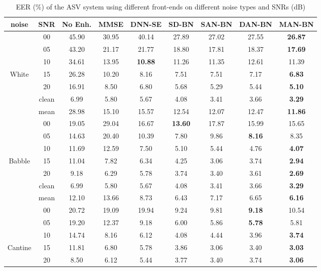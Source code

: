 \documentclass[a4paper,oneside,12pt]{book}
\begin{document}
\begin{table}
\renewcommand{\arraystretch}{1.0}
\caption{ EER ($\%$) of the ASV system using different front-ends on different noise types and SNRs (dB) }
\label{tab:clean}
\begin{tabular}{| c | c | c | c| c|c| c| c|c|}
\hline
noise   &SNR  &No Enh. &MMSE &DNN-SE &SD-BN &SAN-BN & DAN-BN & MAN-BN\\
\hline
      & 00 &45.90 &30.95 &40.14 &27.89 & 27.02 &27.55 &\textbf{26.87}   \\ 
      & 05 &43.20 &21.17 &21.77 &18.80 &17.81 &18.37 & \textbf{17.69}   \\ 
      & 10 &34.61 &13.95 & \textbf{10.88} &11.26 &11.35 &12.61 &11.39   \\ 
White  & 15 &26.28 &10.20 &8.16 &7.51 &7.51 &7.17 & \textbf{6.83}   \\ 
      & 20 &16.91 &8.50 &6.80 &5.68 &5.29 & 5.44 &\textbf{5.10}   \\ 
      & clean &6.99 &5.80 &5.67 &4.08 &3.41 &3.66 & \textbf{3.29}   \\ 
\cline{2-9}     
      & mean &28.98 &15.10 &15.57 &12.54 &12.07 &12.47 & \textbf{11.86}   \\ 
 \hline 
      & 00 &19.05 &29.04 &16.67 & \textbf{13.60} &17.87 &15.99 &15.65   \\ 
      & 05 &14.63 &20.40 &10.39 &7.80 &9.86 &\textbf{8.16} & 8.35   \\ 
      & 10 &11.69 &12.59 &7.50 &5.10 &5.44 &4.76 & \textbf{4.07}   \\ 
Babble  & 15 &11.04 &7.82 &6.34 &4.25 &3.06 &3.74 & \textbf{2.94}   \\ 
      & 20 &9.18 &6.29 &5.78 &3.74 &3.40 &3.61 & \textbf{2.69}   \\ 
      & clean &6.99 &5.80 &5.67 &4.08 &3.41 &3.66 & \textbf{3.29}   \\ 
\cline{2-9}
      & mean &12.10 &13.66 &8.73 &6.43 &7.17 &6.65 & \textbf{6.16}   \\ 
 \hline 
      & 00 &20.72 &19.09 &19.94 &9.24 &9.81 &\textbf{9.18} & 10.54   \\ 
      & 05 &19.20 &12.37 &9.18 &6.00 &5.86 &\textbf{5.78} & 5.81   \\ 
      & 10 &14.74 &8.16 &6.12 &4.08 &4.44 &3.96 & \textbf{3.74}   \\ 
Cantine  & 15 &11.81 &6.80 &5.78 &3.86 &3.06 &3.40 & \textbf{3.03}   \\ 
      & 20 &8.50 &6.12 &5.44 &3.77 &3.40 &3.74 & \textbf{3.06}   \\ 

\end{tabular}
\end{table}
\end{document}
